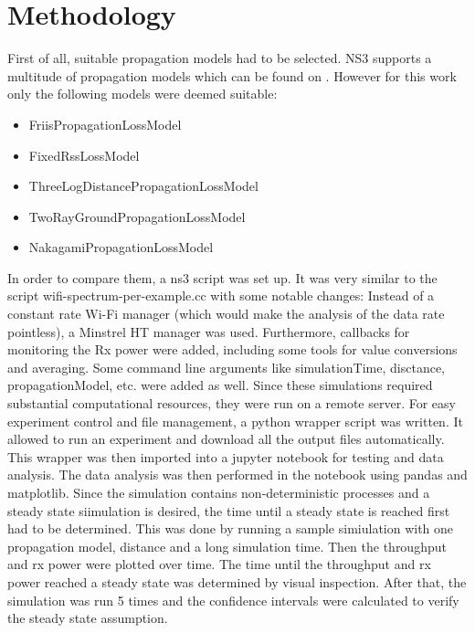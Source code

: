 \section[short]{Methodology}

First of all, suitable propagation models had to be selected.
NS3 supports a multitude of propagation models which can be found on \cite[the ns3 website]{ns3prpmod}.
However for this work only the following models were deemed suitable:
\begin{itemize}
    \item FriisPropagationLossModel
    \item FixedRssLossModel
    \item ThreeLogDistancePropagationLossModel
    \item TwoRayGroundPropagationLossModel
    \item NakagamiPropagationLossModel
\end{itemize}
In order to compare them, a ns3 script was set up. It was very similar to the script wifi-spectrum-per-example.cc 
with some notable changes: Instead of a constant rate Wi-Fi manager (which would make the analysis of the data rate 
pointless), a Minstrel HT manager was used. 
Furthermore, callbacks for monitoring the Rx power were added, including some tools for value conversions and
averaging. Some command line arguments like simulationTime, disctance, propagationModel, etc. were added as well.
Since these simulations required substantial computational resources, they were run on a remote server. 
For easy experiment control and file management, a python wrapper script was written. It allowed to run an experiment 
and download all the output files automatically. This wrapper was then imported into a jupyter notebook for 
testing and data analysis. The data analysis was then performed in the notebook using pandas and matplotlib.
Since the simulation contains non-deterministic processes and a steady state siimulation is desired,
the time until a steady state is reached first had to be determined. This was done by running a sample simiulation 
with one propagation model, distance and a long simulation time. Then the throughput and rx power were plotted over
time. The time until the throughput and rx power reached a steady state was determined by visual inspection.
After that, the simulation was run 5 times and the confidence intervals were calculated to verify the steady 
state assumption.



